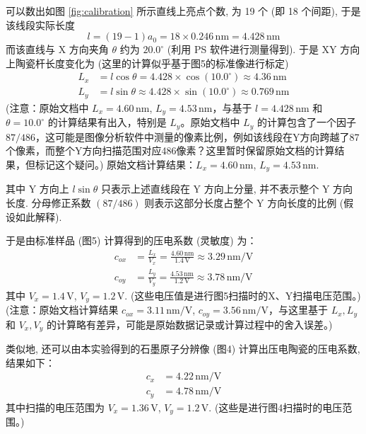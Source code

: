 \documentclass{whureport}
\begin{document}
\begin{multicols}{2}
可以数出如图 \ref{fig:calibration} 所示直线上亮点个数, 为 19 个 (即 18 个间距), 于是该线段实际长度
\[ l = (19 - 1)a_0 = 18 \times 0.246 \, \text{nm} = 4.428 \, \text{nm} \] %
而该直线与 X 方向夹角 \( \theta \) 约为 \( 20.0^\circ \) (利用 PS 软件进行测量得到).
于是 XY 方向上陶瓷杆长度变化为 (这里的计算似乎基于图5的标准像进行标定)
\begin{align}
 L_x &= l \cos \theta = 4.428 \times \cos(10.0^\circ) \approx 4.36 \, \text{nm} \label{eq:Lx} \\ %
 L_y &= l \sin \theta \approx 4.428 \times \sin(10.0^\circ) \approx 0.769 \, \text{nm} \label{eq:Ly} %
\end{align}
(注意：原始文档中 \(L_x = 4.60\,\text{nm}\), \(L_y = 4.53\,\text{nm}\)，与基于 \(l=4.428\,\text{nm}\) 和 \(\theta=10.0^\circ\) 的计算结果有出入，特别是 \(L_y\)。原始文档中 \(L_y\) 的计算包含了一个因子 \(87/486\)，这可能是图像分析软件中测量的像素比例，例如该线段在Y方向跨越了87个像素，而整个Y方向扫描范围对应486像素？这里暂时保留原始文档的计算结果，但标记这个疑问。)
原始文档计算结果：\( L_x = 4.60 \, \text{nm} \), \( L_y = 4.53 \, \text{nm} \).

其中 Y 方向上 \( l \sin \theta \) 只表示上述直线段在 Y 方向上分量, 并不表示整个 Y 方向长度. 分母修正系数 \( (87/486) \) 则表示这部分长度占整个 Y 方向长度的比例 (假设如此解释).

于是由标准样品 (图5) 计算得到的压电系数 (灵敏度) 为：
\begin{align}
 c_{ox} &= \frac{L_x}{V_x} = \frac{4.60 \, \text{nm}}{1.4 \, \text{V}} \approx 3.29 \, \text{nm/V} \label{eq:cox} \\ %
 c_{oy} &= \frac{L_y}{V_y} = \frac{4.53 \, \text{nm}}{1.2 \, \text{V}} \approx 3.78 \, \text{nm/V} \label{eq:coy} %
\end{align}
其中 \( V_x = 1.4 \, \text{V} \), \( V_y = 1.2 \, \text{V} \). (这些电压值是进行图5扫描时的X、Y扫描电压范围。) (注意：原始文档计算结果 \(c_{ox}=3.11\,\text{nm/V}\), \(c_{oy}=3.56\,\text{nm/V}\)，与这里基于 \(L_x, L_y\) 和 \(V_x, V_y\) 的计算略有差异，可能是原始数据记录或计算过程中的舍入误差。)

类似地, 还可以由本实验得到的石墨原子分辨像 (图4) 计算出压电陶瓷的压电系数, 结果如下：
\begin{align} %
 c_x &= 4.22 \, \text{nm/V} \label{eq:cx_exp} \\
 c_y &= 4.78 \, \text{nm/V} \label{eq:cy_exp}
\end{align}
其中扫描的电压范围为 \( V_x = 1.36 \, \text{V} \), \( V_y = 1.2 \, \text{V} \). (这些是进行图4扫描时的电压范围。)


\end{multicols}
\end{document}
